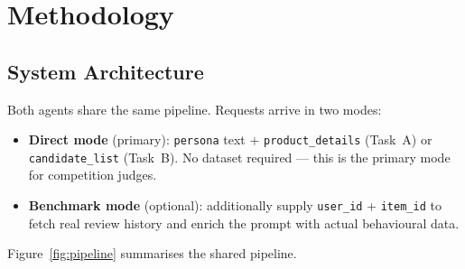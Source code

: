 \documentclass[11pt]{article}
\begin{document}
\section{Methodology}

\subsection{System Architecture}

Both agents share the same pipeline. Requests arrive in two modes:

\begin{itemize}
  \item \textbf{Direct mode} (primary): \texttt{persona} text + \texttt{product\_details} (Task~A) or \texttt{candidate\_list} (Task~B). No dataset required --- this is the primary mode for competition judges.
  \item \textbf{Benchmark mode} (optional): additionally supply \texttt{user\_id} + \texttt{item\_id} to fetch real review history and enrich the prompt with actual behavioural data.
\end{itemize}

Figure~\ref{fig:pipeline} summarises the shared pipeline.
\end{document}

